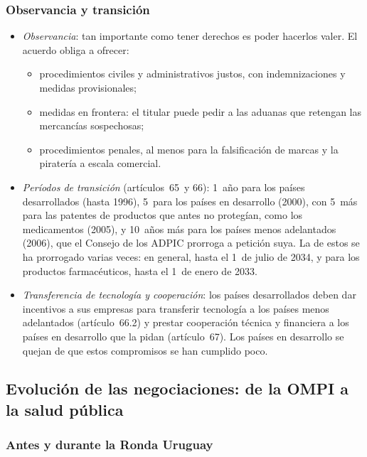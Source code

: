 \documentclass[11pt]{article}
\begin{document}
\subsubsection{Observancia y transición}\label{sec:observancia}

\begin{itemize}
\item \emph{Observancia}: tan importante como tener derechos es poder hacerlos valer. El acuerdo obliga a ofrecer:
  \begin{itemize}
  \item procedimientos civiles y administrativos justos, con indemnizaciones y medidas provisionales;
  \item medidas en frontera: el titular puede pedir a las aduanas que retengan las mercancías sospechosas;
  \item procedimientos penales, al menos para la falsificación de marcas y la piratería a escala comercial.
  \end{itemize}
\item \emph{Períodos de transición} (artículos~65~y 66): 1~año para los países desarrollados (hasta 1996), 5~para los países en desarrollo (2000), con 5~más para las patentes de productos que antes no protegían, como los medicamentos (2005), y 10~años más para los países menos adelantados (2006), que el Consejo de los ADPIC prorroga a petición suya. La de estos se ha prorrogado varias veces: en general, hasta el 1~de julio de 2034, y para los productos farmacéuticos, hasta el 1~de enero de 2033\nocite{OMC2026ADPICPMA}.
\item \emph{Transferencia de tecnología y cooperación}: los países desarrollados deben dar incentivos a sus empresas para transferir tecnología a los países menos adelantados (artículo~66.2) y prestar cooperación técnica y financiera a los países en desarrollo que la pidan (artículo~67). Los países en desarrollo se quejan de que estos compromisos se han cumplido poco.
\end{itemize}

\subsection{Evolución de las negociaciones:\cortetitulo{} de la OMPI a la salud pública}\label{sec:adpic-negociaciones}

\subsubsection{Antes y durante la Ronda Uruguay}\label{sec:adpic-origen}
\end{document}
